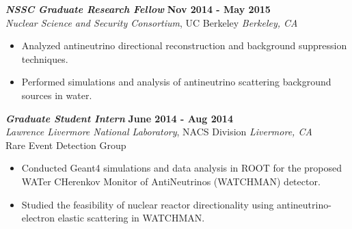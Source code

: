 \documentclass[margin, 10pt]{style/res} %
\begin{document}
\begin{resume}
{\sl\bf NSSC Graduate Research Fellow} \hfill {\bf Nov 2014 - May 2015} \\
{\sl Nuclear Science and Security Consortium}, UC Berkeley \hfill {\sl Berkeley, CA} %
\vspace{2pt}
\begin{itemize}[leftmargin=4ex] \itemsep -2pt
\item Analyzed antineutrino directional reconstruction and background suppression techniques.
\item Performed simulations and analysis of antineutrino scattering background sources in water.
\end{itemize} 
 
{\sl\bf Graduate Student Intern} \hfill {\bf June 2014 - Aug 2014} \\
{\sl Lawrence Livermore National Laboratory}, NACS Division \hfill {\sl Livermore, CA} \\
Rare Event Detection Group
\vspace{2pt}
\begin{itemize}[leftmargin=4ex] \itemsep -2pt
\item Conducted Geant4 simulations and data analysis in ROOT for the proposed WATer CHerenkov Monitor of AntiNeutrinos (WATCHMAN) detector.
\item Studied the feasibility of nuclear reactor directionality using antineutrino-electron elastic scattering in WATCHMAN.
\end{itemize}


\end{resume}
\end{document}
